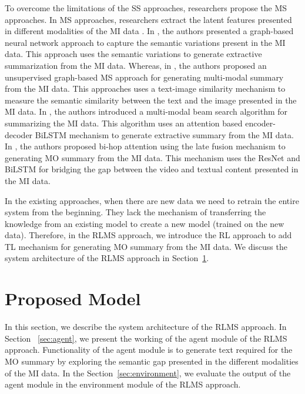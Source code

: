 \documentclass[preprint,review,12pt]{elsarticle}
\begin{document}
To overcome the limitations of the SS approaches, researchers propose the MS approaches. In MS approaches, researchers extract the latent features presented in different modalities of the MI data \cite{27, 28, 29, 30}.  In \cite{27}, the authors presented a graph-based neural network approach to capture the semantic variations present in the MI data. This approach uses the semantic variations to generate extractive summarization from the MI data. Whereas, in \cite{28}, the authors proposed an unsupervised graph-based MS approach for generating multi-modal summary from the MI data. This approaches uses a text-image similarity mechanism to measure the semantic similarity between the text and the image presented in the MI data. In \cite{29}, the authors introduced a multi-modal beam search algorithm for summarizing the MI data. This algorithm uses an attention based encoder-decoder BiLSTM mechanism to generate extractive summary from the MI data. In \cite{30}, the authors proposed bi-hop attention using the late fusion mechanism to generating MO summary from the MI data. This mechanism uses the ResNet and BiLSTM for bridging the gap between the video and textual content presented in the MI data.

In the existing approaches, when there are new data we need to retrain the entire system from the beginning. They lack the mechanism of transferring the knowledge from an existing model to create a new model (trained on the new data). Therefore, in the RLMS approach, we introduce the RL approach to add TL mechanism for generating MO summary from the MI data. We discuss the system architecture of the RLMS approach in Section~\ref{sec:model}.

	
\section{Proposed Model}\label{sec:model}

In this section, we describe the system architecture of the RLMS approach. In Section ~\ref{sec:agent}, we present the working of the agent module of the RLMS approach.  Functionality of the agent module is to generate text required for the MO summary by exploring the semantic gap presented in the different modalities of the MI data. In the Section~\ref{sec:environment}, we evaluate the output of the agent module in the environment module of the RLMS approach. 
\end{document}
